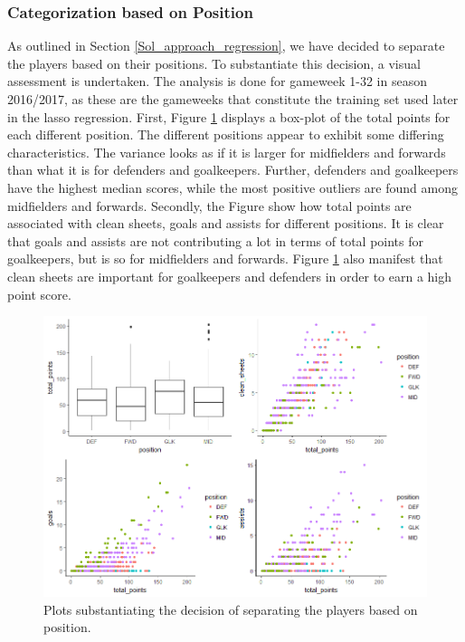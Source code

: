 \subsubsection{Categorization based on Position}

As outlined in Section \ref{Sol_approach_regression}, we have decided to separate the players based on their positions. To substantiate this decision, a visual assessment is undertaken. The analysis is done for gameweek 1-32 in season 2016/2017, as these are the gameweeks that constitute the training set used later in the lasso regression. First, Figure \ref{fig:cluster_plots} displays a box-plot of the total points for each different position. The different positions appear to exhibit some differing characteristics. The variance looks as if it is larger for midfielders and forwards than what it is for defenders and goalkeepers. Further, defenders and goalkeepers have the highest median scores, while the most positive outliers are found among midfielders and forwards. Secondly, the Figure show how total points are associated with clean sheets, goals and assists for different positions. It is clear that goals and assists are not contributing a lot in terms of total points for goalkeepers, but is so for midfielders and forwards. Figure \ref{fig:cluster_plots} also manifest that clean sheets are important for goalkeepers and defenders in order to earn a high point score.

\begin{figure}[H]
    \centering
    \includegraphics[scale=0.55]{fig/chapter_6/cluster_plots.png}
    \caption{Plots substantiating the decision of separating the players based on position.}
\label{fig:cluster_plots}    
\end{figure}





